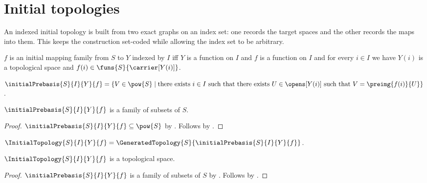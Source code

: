 \section{Initial topologies}



An indexed initial topology is built from two exact graphs on an index set:
one records the target spaces and the other records the maps into them.  This
keeps the construction set-coded while allowing the index set to be arbitrary.

\begin{definition}\label{initial_topology_data}
    $f$ is an initial mapping family from $S$ to $Y$ indexed by $I$ iff
        $Y$ is a function on $I$ and
        $f$ is a function on $I$ and
        for every $i\in I$ we have $Y(i)$ is a topological space and
            $f(i)\in\funs{S}{\carrier[Y(i)]}$.
\end{definition}

\begin{definition}\label{initial_prebasis}
    $\initialPrebasis{S}{I}{Y}{f}
        =\{V\in\pow{S}\mid
            \text{there exists $i\in I$ such that there exists
                $U\in\opens[Y(i)]$ such that
                $V=\preimg{f(i)}{U}$}\}$.
\end{definition}

\begin{proposition}\label{initial_prebasis_type}
    $\initialPrebasis{S}{I}{Y}{f}$ is a family of subsets of $S$.
\end{proposition}
\begin{proof}
    $\initialPrebasis{S}{I}{Y}{f}\subseteq\pow{S}$ by
        .
    Follows by .
\end{proof}

\begin{definition}\label{initial_topology}
    $\InitialTopology{S}{I}{Y}{f}
        =\GeneratedTopology{S}{\initialPrebasis{S}{I}{Y}{f}}$.
\end{definition}

\begin{classification}\label{initial_topology_is_topological_space}
    $\InitialTopology{S}{I}{Y}{f}$ is a topological space.
\end{classification}
\begin{proof}
    $\initialPrebasis{S}{I}{Y}{f}$ is a family of subsets of $S$ by
        .
    Follows by
        .
\end{proof}

